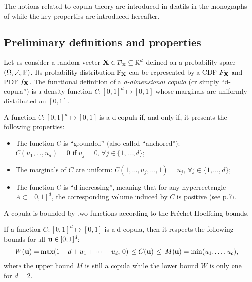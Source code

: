 The notions related to copula theory are introduced in deatils in the monographs of \citet{nelsen_2006_copulas,joe_2014,durante_2015_copula} while the key properties are introduced hereafter.


\subsection{Preliminary definitions and properties}\label{sec:copula_prelims}

Let us consider a random vector ${\bf X} \in \mathcal{D}_{{\bf x}}\subseteq\mathbb{R}^d$ defined on a probability space $(\Omega, \mathcal{A}, \mathbb{P})$. 
Its probability distribution $\mathbb{P}_{\bf X}$ can be represented by a CDF $F_{\bf X}$ and PDF $f_{\bf X}$. 
The functional definition of a \textit{d-dimensional copula} (or simply ``d-copula'') is a density function $C:[0, 1]^d \mapsto [0, 1]$ whose marginals are uniformly distributed on $[0, 1]$.
\begin{definition}[Copula]
    A function $C:[0, 1]^d \mapsto [0, 1]$ is a d-copula if, and only if, it presents the following properties:
    \begin{itemize}
        \item The function $C$ is ``grounded'' (also called ``anchored''): \\$C(u_1, \dots, u_d) = 0$ if $u_j=0, \, \forall j\in\{1, \dots, d\}$;
        \item The marginals of $C$ are uniform: $C(1, \dots, u_j, \dots, 1) = u_j,  \, \forall j\in\{1, \dots, d\}$;
        \item The function $C$ is ``d-increasing'', meaning that for any hyperrectangle $A \subset [0, 1]^d$, the corresponding volume induced by $C$ is positive (see \cite{durante_2015_copula} p.7). 
    \end{itemize}
\end{definition}

A copula is bounded by two functions according to the Fréchet-Hoeffding bounds. 
\begin{theorem}
    If a function $C:[0, 1]^d \mapsto [0, 1]$ is a d-copula, then it respects the following bounds for all ${\bf u} \in [0, 1]^d$: 
    \begin{equation}
        W({\bf u}) = \max (1 - d + u_1 + \dots + u_d, \, 0) \, \leq C({\bf u}) \, \leq \, M({\bf u}) = \min(u_1,\dots ,u_d),
    \end{equation} 
    where the upper bound $M$ is still a copula while the lower bound $W$ is only one for $d=2$.
\end{theorem}

